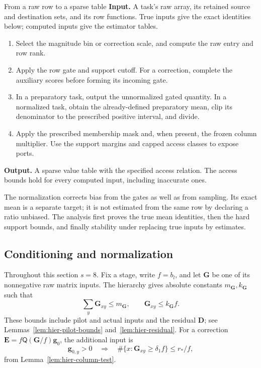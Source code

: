 \documentclass[11pt]{article}
\numberwithin{equation}{section}
\theoremstyle{definition}
\theoremstyle{remark}
\begin{document}
\begin{algorithm}[label=alg:sample-table]{From a raw row to a sparse table}
\textbf{Input.} A task's raw array, its retained source and destination sets, and its row functions. True inputs give the exact identities below; computed inputs give the estimator tables.
\begin{enumerate}[leftmargin=*]
\item Select the magnitude bin or correction scale, and compute the raw entry and row rank.
\item Apply the row gate and support cutoff. For a correction, complete the auxiliary scores before forming its incoming gate.
\item In a preparatory task, output the unnormalized gated quantity. In a normalized task, obtain the already-defined preparatory mean, clip its denominator to the prescribed positive interval, and divide.
\item Apply the prescribed membership mask and, when present, the frozen column multiplier. Use the support margins and capped access classes to expose ports.
\end{enumerate}
\textbf{Output.} A sparse value table with the specified access relation. The access bounds hold for every computed input, including inaccurate ones.
\end{algorithm}

The normalization corrects bias from the gates as well as from sampling. Its exact mean is a separate target; it is not estimated from the same row by declaring a ratio unbiased. The analysis first proves the true mean identities, then the hard support bounds, and finally stability under replacing true inputs by estimates.

\subsection{Conditioning and normalization}

Throughout this section $s=8$.  Fix a stage, write $f=b_l$, and let ${\mathbf{G}}$ be
one of its nonnegative raw matrix inputs.  The hierarchy gives absolute
constants ${m}_{\mathbf{G}},{k}_{\mathbf{G}}$ such that
\begin{equation}
 \sum_y {\mathbf{G}}_{xy}\le {m}_{\mathbf{G}},\qquad {\mathbf{G}}_{xy}\le {k}_{\mathbf{G}} f.
 \label{eq:atom-input-bounds}
\end{equation}
These bounds include pilot and actual inputs and the residual ${\mathbf{D}}$; see
Lemmas~\ref{lem:hier-pilot-bounds} and~\ref{lem:hier-residual}.
For a correction ${\mathbf{E}}=f{\mathsf{Q}}({\mathbf{G}}/f){\mathbf{g}}_0$, the additional input is
\begin{equation}
 {\mathbf{g}}_{0,y}>0\quad\Longrightarrow\quad
 \#\{x:{\mathbf{G}}_{xy}\ge\delta_1 f\}\le {r}_*/f,
 \label{eq:atom-column-input}
\end{equation}
from Lemma~\ref{lem:hier-column-test}.
\end{document}
